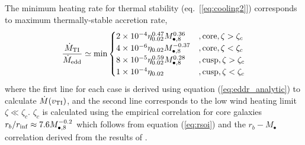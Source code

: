 \documentclass[usenatbib,fleqn]{mn2e}
\begin{document}
The minimum heating rate for thermal stability (eq.~[\ref{eq:cooling2}]) corresponds to maximum thermally-stable accretion rate,
\begin{align}
  \frac{\dot{M}_{\rm TI}}{\dot{M}_{\rm edd}} \simeq {\rm
    min}\begin{cases}
    2\times 10^{-4} \eta_{0.02}^{0.47} M_{\bullet,8}^{0.36} &, \text{core}, \zeta > \zeta_c\\
    4\times 10^{-6}\eta_{0.02}M_{\bullet,8}^{-0.37} &, \text{core}, \zeta < \zeta_c \\
    8\times 10^{-5} \eta_{0.02}^{0.59} M_{\bullet,8}^{0.28}    &, \text{cusp}, \zeta > \zeta_c\\
    1\times 10^{-4}\eta_{0.02}&, \text{cusp}, \zeta < \zeta_c
  \end{cases}
  \label{eq:Mdotmax}
\end{align}
where the first line for each case is derived using equation
(\ref{eq:eddr_analytic}) to calculate $\dot{M}(v_{\rm TI})$, and
the second line corresponds to the low wind heating limit $\zeta \ll
\zeta_c$.  $\zeta_c$ is calculated using the empirical correlation for
core galaxies $r_{b}/r_{\rm inf} \approx 7.6M_{\bullet,8}^{-0.2}$ which
follows from equation (\ref{eq:rsoi}) and the $r_b-M_{\bullet}$
correlation derived from the results of \citet{LauerFaber+:2007a}.
\end{document}
